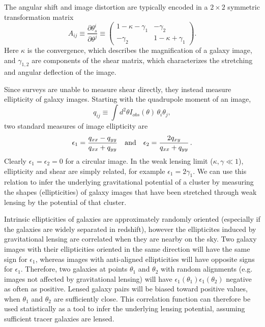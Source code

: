 \documentclass[useAMS,fleqn,usenatbib]{mn2e}
\begin{document}
The angular shift and image distortion are typically  encoded in a $2\times 2$ 
symmetric transformation matrix
\begin{equation}\label{matrix}
A_{ij}\equiv \frac{\partial \theta_s^i}{\partial \theta^j}\equiv 
\begin{pmatrix}
1-\kappa-\gamma_1 & -\gamma_2 \\
-\gamma_2 & 1-\kappa+\gamma_1
\end{pmatrix}.
\end{equation}
Here $\kappa$ is the convergence, which describes the magnification of a galaxy image, 
and $\gamma_{1,2}$ are components of the shear matrix, which characterizes the stretching and angular 
deflection of the image. 
 
Since surveys are unable to measure shear directly, they instead measure ellipticity of galaxy 
images. Starting with   the quadrupole moment of an image,
\begin{equation}
q_{ij}\equiv \int d^2\theta I_{obs}(\theta)\,\theta_i \theta_j ,
\end{equation}
two standard measures of image ellipticity  are 
\begin{equation}
\epsilon_1 = \frac{q_{xx}-q_{yy}}{q_{xx}+q_{yy}}
\quad {\rm and} \quad
\epsilon_2 = \frac{2q_{xy}}{q_{xx}+q_{yy}}\,.
\end{equation}
Clearly $\epsilon_1 = \epsilon_2 = 0$ for a circular image. In the weak 
lensing limit ($\kappa, \gamma\ll1$),  ellipticity and shear are simply related, for example  $\epsilon_1=2\gamma_1$.
We can use this relation to infer the underlying gravitational potential of a cluster
by measuring the shapes (ellipticities) of galaxy images that have been stretched through  weak 
 lensing by the potential of that cluster.

Intrinsic ellipticities of galaxies are 
approximately randomly oriented
 (especially if the galaxies are widely separated in redshift), however
the ellipticites induced by gravitational lensing are correlated when they are nearby on the sky.
Two  galaxy images with their ellipticities oriented in the same direction 
will have the same sign for  $\epsilon_1$, whereas images with anti-aligned ellipticities will have 
opposite signs for $\epsilon_1$. Therefore, two galaxies at points $\theta_1$ and $\theta_2$ with random alignments
(e.g. images not affected by gravitational lensing) will  have 
$\epsilon_1(\theta_1)\epsilon_1(\theta_2) $ negative as often as  positive.  Lensed galaxy pairs 
will be biased toward positive values, when $\theta_1$ and $\theta_2$ are sufficiently close.
This  correlation function can therefore be used statistically as a tool to infer the underlying lensing
potential, assuming sufficient tracer galaxies are lensed. 
 
\end{document}
